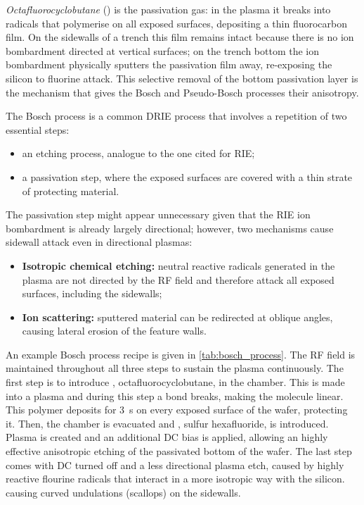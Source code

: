 \begin{itemize}
    \textit{Octafluorocyclobutane} () is the passivation gas: in the
    plasma it breaks into  radicals that polymerise on all exposed
    surfaces, depositing a thin fluorocarbon film. On the sidewalls of a trench
    this film remains intact because there is no ion bombardment directed at
    vertical surfaces; on the trench bottom the ion bombardment physically
    sputters the passivation film away, re-exposing the silicon to fluorine
    attack. This selective removal of the bottom passivation layer is the
    mechanism that gives the Bosch and Pseudo-Bosch processes their anisotropy.

    The Bosch process is a common DRIE process that involves a repetition of two
    essential steps:
    \begin{itemize}
      \item an etching process, analogue to the one cited for RIE;
      \item a passivation step, where the exposed surfaces are
        covered with a thin strate
        of protecting material.
    \end{itemize}
    The passivation step might appear unnecessary given that the RIE ion
    bombardment is already largely directional; however, two mechanisms cause
    sidewall attack even in directional plasmas:
    \begin{itemize}
      \item \textbf{Isotropic chemical etching:} neutral reactive radicals generated
        in the plasma are not directed by the RF field and therefore attack all
        exposed surfaces, including the sidewalls;
      \item \textbf{Ion scattering:} sputtered material can be redirected at
        oblique angles, causing lateral erosion of the feature walls.
    \end{itemize}
    An example Bosch process recipe is given in \cref{tab:bosch_process}. The RF
    field is maintained throughout all three steps to sustain the plasma
    continuously.
    The first step is to introduce , octafluorocyclobutane, in the
    chamber. This is made into a plasma and during this step a bond
    breaks, making the molecule linear.
    This polymer deposits for \SI{3}{\second} on every exposed
    surface of the wafer, protecting it.
    Then, the chamber is evacuated and , sulfur hexafluoride,
    is introduced.
    Plasma is created and an additional DC bias is applied, allowing
    an highly effective
    anisotropic etching of the passivated bottom of the wafer.
    The last step comes with DC turned off and a less directional
    plasma etch, caused
    by highly reactive flourine radicals that interact in a more
    isotropic way with the silicon.
    causing curved undulations (scallops) on the sidewalls.


\end{itemize}
